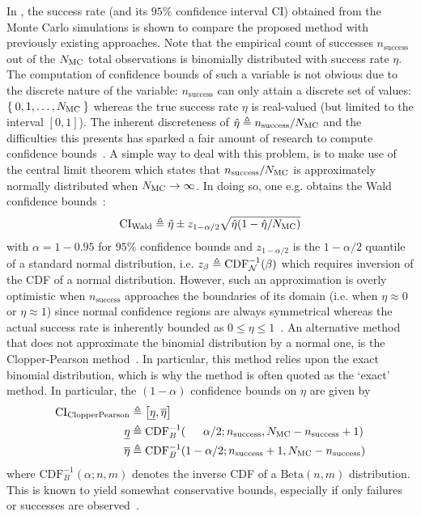 In , the success rate (and its $95\%$ confidence interval $\mathrm{CI}$) obtained from the Monte Carlo simulations is shown to compare the proposed method with previously existing approaches.
Note that the empirical count of successes $n_{\mathrm{success}}$ out of the $N_{\mathrm{MC}}$ total observations is binomially distributed with success rate $\eta$.
The computation of confidence bounds of such a variable is not obvious due to the discrete nature of the variable: $n_{\mathrm{success}}$ can only attain a discrete set of values: $\Set{0,1,\ldots, N_{\ensuremath{\mathrm{MC}}}}$ whereas the true success rate $\eta$ is real-valued (but limited to the interval $[0,1]$).
The inherent discreteness of $\hat{\eta} \triangleq n_{\mathrm{success}}/N_{\mathrm{MC}}$ and the difficulties this presents has sparked a fair amount of research to compute confidence bounds~\citep{Barnard1947Significance,Mato1997,Ross2003,Clopper1934}.
A simple way to deal with this problem, is to make use of the central limit theorem which states that $n_{\mathrm{success}}/N_{\mathrm{MC}}$ is approximately normally distributed when $N_{\mathrm{MC}} \to \infty$.
In doing so, one e.g. obtains the Wald confidence bounds~\citep{Ross2003}:
\begin{equation}
\mathrm{CI}_{\mathrm{Wald}} \triangleq \hat{\eta} \pm z_{1-\alpha/2} \sqrt{\hat{\eta} (1-\hat{\eta}/N_{\mathrm{MC}})}
\end{equation}
with $\alpha = 1 - 0.95$ for $95\%$ confidence bounds and $z_{1-\alpha/2}$ is the $1-\alpha/2$ quantile of a standard normal distribution, i.e. $z_{\beta} \triangleq \mathrm{CDF}_{\operatorname{\mathcal{N}}}^{-1}(\beta)$
which requires inversion of the \gls{CDF} of a normal distribution.
However, such an approximation is overly optimistic when $n_{\mathrm{success}}$ approaches the boundaries of its domain (i.e. when $\eta \approx 0$ or $\eta \approx 1$) since normal confidence regions are always symmetrical whereas the actual success rate is inherently bounded as $0 \leq \eta \leq 1$~\citep{Ross2003}.
An alternative method that does not approximate the binomial distribution by a normal one, is the Clopper-Pearson method~\citep{Clopper1934}.
In particular, this method relies upon the exact binomial distribution, which is why the method is often quoted as the `exact' method.
In particular, the $(1-\alpha)$  confidence bounds on $\eta$ are given by~\citep{Clopper1934}
\begin{align}
 \mathrm{CI}_{\mathrm{ClopperPearson}}  & \triangleq \left[ \underline{\eta}, \overline{\eta} \right]\\
 \underline{\eta} &\triangleq 
  \mathrm{CDF}_B^{-1}(\phantom{1-\;}\alpha/2; n_{\mathrm{success}}, N_{\mathrm{MC}} - n_{\mathrm{success}} + 1)\\
  \overline{\eta} &\triangleq
  \mathrm{CDF}_B^{-1}(1-\alpha/2; n_{\mathrm{success}} + 1, N_{\mathrm{MC}} - n_{\mathrm{success}})
\end{align}
where $\mathrm{CDF}_B^{-1}(\alpha; n,m)$ denotes the inverse \gls{CDF} of a $\mathrm{Beta}(n,m)$ distribution.
This is known to yield somewhat conservative bounds, especially if only failures or successes are observed~\citep{Ross2003}.

